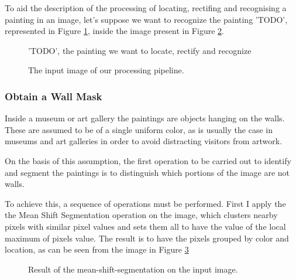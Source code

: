 \documentclass[10pt,twocolumn,letterpaper]{article}
\begin{document}
To aid the description of the processing of locating, rectifing and recognising a painting in an image, let's suppose we want to recognize the painting 'TODO', represented in Figure \ref{fig:dbPainting}, inside the image present in Figure \ref{fig:originalImage}.

\begin{figure}[t]
   \begin{center}
   \fbox{\rule{0pt}{2in} \rule{0.9\linewidth}{0pt}}
   \end{center}
      \caption{'TODO', the painting we want to locate, rectify and recognize}
   \label{fig:dbPainting}
   \end{figure}

\begin{figure}[t]
   \begin{center}
   \fbox{\rule{0pt}{2in} \rule{0.9\linewidth}{0pt}}
   \end{center}
      \caption{The input image of our processing pipeline.}
   \label{fig:originalImage}
\end{figure}

\subsubsection{Obtain a Wall Mask}

Inside a museum or art gallery the paintings are objects hanging on the walls. These are assumed to be of a single uniform color, as is usually the case in museums and art galleries in order to avoid distracting visitors from artwork.

On the basis of this assumption, the first operation to be carried out to identify and segment the paintings is to distinguish which portions of the image are not walls. 

To achieve this, a sequence of operations must be performed. First I apply the the Mean Shift Segmentation operation on the image, which clusters nearby pixels with similar pixel values and sets them all to have the value of the local maximum of pixels value. The result is to have the pixels grouped by color and location, as can be seen from the image in Figure \ref{fig:meanShiftSegmentation}

\begin{figure}[t]
   \begin{center}
   \fbox{\rule{0pt}{2in} \rule{0.9\linewidth}{0pt}}
   \end{center}
      \caption{Result of the mean-shift-segmentation on the input image.}
   \label{fig:meanShiftSegmentation}
\end{figure}
\end{document}
